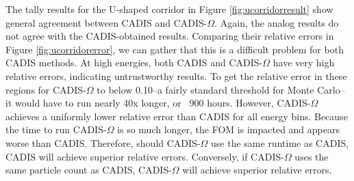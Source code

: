 The tally results for the U-shaped corridor in Figure \ref{fig:ucorridorresult}
show general agreement between CADIS and CADIS-$\Omega$. Again, the analog results
do not agree with the CADIS-obtained results. Comparing their relative errors in Figure
\ref{fig:ucorridorerror}, we can gather that this is a difficult problem for
both CADIS methods. At high energies, both CADIS and CADIS-$\Omega$ have very high
relative errors, indicating untrustworthy results. To get the relative error in
these regions for CADIS-$\Omega$ to below 0.10--a fairly standard threshold for
Monte Carlo--it would have to run nearly 40x longer, or ~900 hours. However,
CADIS-$\Omega$ achieves a uniformly lower relative error than CADIS for all
energy bins. Because the time to run CADIS-$\Omega$ is so much longer, the FOM
is impacted and appears worse than CADIS. Therefore, should CADIS-$\Omega$ use
the same runtime as CADIS, CADIS will achieve superior relative errors.
Conversely, if CADIS-$\Omega$ uses the same particle count as CADIS,
CADIS-$\Omega$ will achieve superior relative errors.

